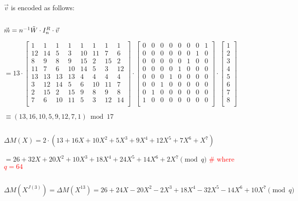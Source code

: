 $ $

$\vec{v}$ is encoded as follows:

$ $

$\vec{m} = n^{-1} \tilde{W} \cdot I_n^R \cdot \vec{v} $

$= 13 \cdot  \begin{bmatrix}
1 & 1 & 1 & 1 & 1 & 1 & 1 & 1\\
12&14&5&3&10&11&7&6\\
8&9&8&9&15&2&15&2\\
11&7&6&10&14&5&3&12\\
13&13&13&13&4&4&4&4\\
3&12&14&5&6&10&11&7\\
2&15&2&15&9&8&9&8\\
7&6&10&11&5&3&12&14\\
\end{bmatrix} \cdot \begin{bmatrix}
0 & 0 & 0 & 0 & 0 & 0 & 0 & 1\\
0 & 0 & 0 & 0 & 0 & 0 & 1 & 0\\
0 & 0 & 0 & 0 & 0 & 1 & 0 & 0\\
0 & 0 & 0 & 0 & 1 & 0 & 0 & 0\\
0 & 0 & 0 & 1 & 0 & 0 & 0 & 0\\
0 & 0 & 1 & 0 & 0 & 0 & 0 & 0\\
0 & 1 & 0 & 0 & 0 & 0 & 0 & 0\\
1 & 0 & 0 & 0 & 0 & 0 & 0 & 0\\
\end{bmatrix} \cdot \begin{bmatrix}
1\\
2\\
3\\
4\\
5\\
6\\
7\\
8\\
\end{bmatrix}$

$ \equiv (13, 16, 10, 5, 9, 12, 7, 1)  \bmod 17$


$ $

$\Delta M(X) = 2\cdot(13 + 16X + 10X^2 + 5X^3 + 9X^4 + 12X^5 + 7X^6 + X^7)$

$ = 26 + 32X + 20X^2 + 10X^3 + 18X^4 + 24X^5 + 14X^6 + 2X^7 \pmod{q}$ \textcolor{red}{\text{ } \# where $q = 64$}

$ $


$\Delta M(X^{J(3)}) = \Delta M(X^{13}) = 26 + 24X - 20X^2 - 2X^3 + 18X^4 - 32X^5 - 14X^6 + 10X^7 \pmod{q}$

